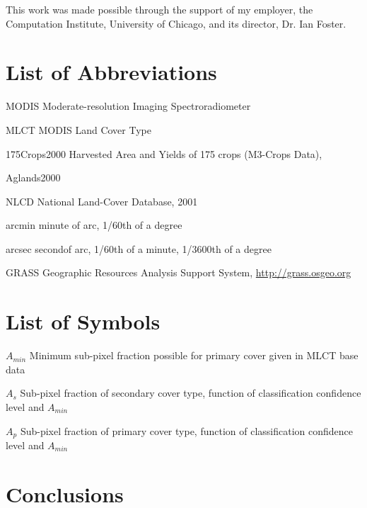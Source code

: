 \documentclass[draftthesis]{neiuthesis}
\begin{document}
This work was made possible through the support of my employer, the
Computation Institute, University of Chicago, and its director,
Dr. Ian Foster.  


\tableofcontents \listoftables \listoffigures

\chapter{List of Abbreviations}

\begin{symbollist*}
\item[MODIS] Moderate-resolution Imaging Spectroradiometer
\item[MLCT] MODIS Land Cover Type \citep{MLCT}
\item[175Crops2000] Harvested Area and Yields of 175 crops (M3-Crops
  Data), \citep{Monfreda2008}
\item[Aglands2000] \citep{Ramankutty2008}
\item[NLCD] National Land-Cover Database, 2001 \citep{Homer2004}
\item[arcmin] minute of arc, 1/60th of a degree
\item[arcsec] secondof arc, 1/60th of a minute, 1/3600th of a degree
\item[GRASS] Geographic Resources Analysis Support System, \url{http://grass.osgeo.org}

\end{symbollist*}

\chapter{List of Symbols}

\begin{symbollist}[0.7in]
\item[$A_{min}$] Minimum sub-pixel fraction possible for primary cover
  given in MLCT base data
\item[$A_s$] Sub-pixel fraction of secondary cover type, function of
  classification confidence level and $A_{min}$
\item[$A_p$] Sub-pixel fraction of primary cover type, function of
  classification confidence level and $A_{min}$
\end{symbollist}

\mainmatter

\todototoc
\listoftodos





\chapter{Conclusions}


\appendix*

%

\backmatter


\end{document}
